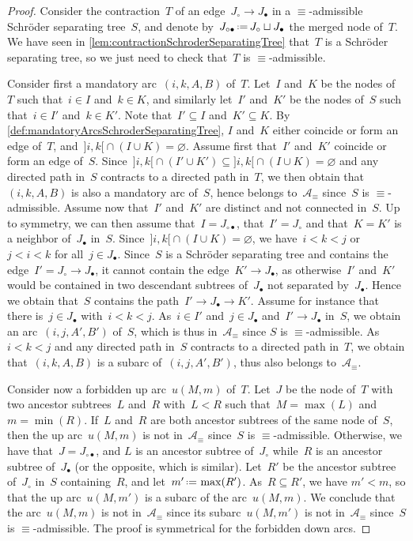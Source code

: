 \documentclass{amsart}
\theoremstyle{definition}
\newcommand{\eqdef}{\mbox{\,\raisebox{0.2ex}{\scriptsize\ensuremath{\mathrm:}}\ensuremath{=}\,}} %
\newcommand{\arcs}{{\mathcal{A}}} %
\begin{document}
\begin{proof}
Consider the contraction~$T$ of an edge~$J_\circ \to J_\bullet$ in a $\equiv$-admissible Schröder separating tree~$S$, and denote by~$J_{\circ\bullet} \eqdef J_\circ \sqcup J_\bullet$ the merged node of~$T$.
We have seen in \cref{lem:contractionSchroderSeparatingTree} that~$T$ is a Schröder separating tree, so we just need to check that~$T$ is $\equiv$-admissible.

Consider first a mandatory arc~$(i,k,A,B)$ of~$T$.
Let~$I$ and~$K$ be the nodes of~$T$ such that~$i \in I$ and~$k \in K$, and similarly let~$I'$ and~$K'$ be the nodes of~$S$ such that~$i \in I'$ and~$k \in K'$.
Note that~$I' \subseteq I$ and~$K' \subseteq K$.
By \cref{def:mandatoryArcsSchroderSeparatingTree}, $I$ and~$K$ either coincide or form an edge of~$T$, and~${{]i,k[} \cap (I \cup K) = \varnothing}$.
Assume first that~$I'$ and~$K'$ coincide or form an edge of~$S$.
Since~${{]i,k[} \cap (I' \cup K') \subseteq {]i,k[} \cap (I \cup K) = \varnothing}$ and any directed path in~$S$ contracts to a directed path in~$T$, we then obtain that~$(i,k,A,B)$ is also a mandatory arc of~$S$, hence belongs to~$\arcs_\equiv$ since~$S$ is $\equiv$-admissible.
Assume now that~$I'$ and~$K'$ are distinct and not connected in~$S$.
Up to symmetry, we can then assume that~$I = J_{\circ\bullet}$, that~$I' = J_\circ$ and that~$K = K'$ is a neighbor of~$J_\bullet$ in~$S$.
Since~${]i,k[} \cap (I \cup K) = \varnothing$, we have~$i < k < j$ or~$j < i < k$  for all~$j \in J_\bullet$.
Since~$S$ is a Schröder separating tree and contains the edge~$I' = J_\circ \to J_\bullet$, it cannot contain the edge~$K' \to J_\bullet$, as otherwise~$I'$ and~$K'$ would be contained in two descendant subtrees of~$J_\bullet$ not separated by~$J_\bullet$.
Hence we obtain that~$S$ contains the path~$I' \to J_\bullet \to K'$.
Assume for instance that there is~$j \in J_\bullet$ with~$i < k < j$.
As~$i \in I'$ and~$j \in J_\bullet$ and~$I' \to J_\bullet$ in~$S$, we obtain an arc~$(i, j, A', B')$ of~$S$, which is thus in~$\arcs_\equiv$ since $S$ is $\equiv$-admissible.
As~$i < k < j$ and any directed path in~$S$ contracts to a directed path in~$T$, we obtain that~$(i,k,A,B)$ is a subarc of~$(i,j,A',B')$, thus also belongs to~$\arcs_\equiv$.

Consider now a forbidden up arc~$u(M,m)$ of~$T$.
Let~$J$ be the node of~$T$ with two ancestor subtrees~$L$ and~$R$ with~$L < R$ such that~$M = \max(L)$ and~$m = \min(R)$.
If~$L$ and~$R$ are both ancestor subtrees of the same node of~$S$, then the up arc~$u(M,m)$ is not in~$\arcs_\equiv$ since~$S$ is \mbox{$\equiv$-admissible}.
Otherwise, we have that~$J = J_{\circ\bullet}$, and $L$ is an ancestor subtree of~$J_\circ$ while~$R$ is an ancestor subtree of~$J_\bullet$ (or the opposite, which is similar).
Let~$R'$ be the ancestor subtree of~$J_\circ$ in~$S$ containing~$R$, and let~$m' \eqdef \max(R')$.
As~${R \subseteq R'}$, we have $m' < m$, so that the up arc~$u(M, m')$ is a subarc of the arc~$u(M,m)$.
We conclude that the arc~$u(M,m)$ is not in~$\arcs_\equiv$ since its subarc~$u(M, m')$ is not in~$\arcs_\equiv$ since~$S$ is $\equiv$-admissible.
The proof is symmetrical for the forbidden down arcs.
\end{proof}
\end{document}
